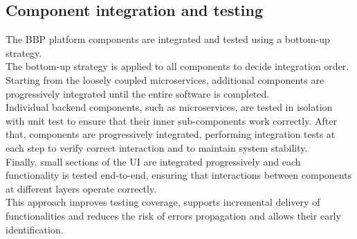 \subsection{Component integration and testing}
The BBP platform components are integrated and tested using a bottom-up strategy. \\[5pt]
The bottom-up strategy is applied to all components to decide integration order. Starting from the loosely coupled microservices, additional components are progressively integrated until the entire software is completed.\\[5pt]
Individual backend components, such as microservices, are tested in isolation with unit test to ensure that their inner sub-components work correctly. After that, components are progressively integrated, performing integration tests at each step to verify correct interaction and to maintain system stability.\\[5pt]
Finally, small sections of the UI are integrated progressively and each functionality is tested end-to-end, ensuring that interactions between components at different layers operate correctly.\\[5pt]
This approach improves testing coverage, supports incremental delivery of functionalities and reduces the risk of errors propagation and allows their early identification.
